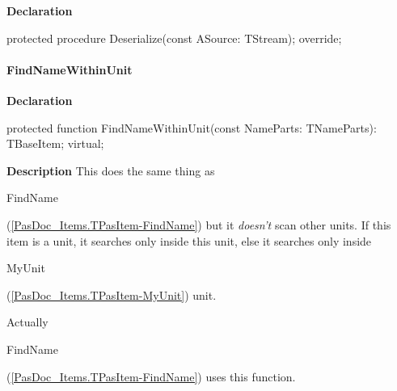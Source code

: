 \documentclass{report}
\newif\ifpdf
\begin{document}
\label{PasDoc_Items.TPasItem-Deserialize}
\begin{list}{}{
\setlength{\itemindent}{0cm}
\setlength{\listparindent}{0cm}
\setlength{\leftmargin}{\evensidemargin}
\addtolength{\leftmargin}{\tmplength}
\settowidth{\labelsep}{X}
\addtolength{\leftmargin}{\labelsep}
\setlength{\labelwidth}{\tmplength}
}
\item[\textbf{Declaration}\hfill]
\ifpdf
\begin{flushleft}
\fi
\begin{ttfamily}
protected procedure Deserialize(const ASource: TStream); override;\end{ttfamily}

\ifpdf
\end{flushleft}
\fi

\end{list}
\paragraph*{FindNameWithinUnit}\hspace*{\fill}

\label{PasDoc_Items.TPasItem-FindNameWithinUnit}
\begin{list}{}{
\setlength{\itemindent}{0cm}
\setlength{\listparindent}{0cm}
\setlength{\leftmargin}{\evensidemargin}
\addtolength{\leftmargin}{\tmplength}
\settowidth{\labelsep}{X}
\addtolength{\leftmargin}{\labelsep}
\setlength{\labelwidth}{\tmplength}
}
\item[\textbf{Declaration}\hfill]
\ifpdf
\begin{flushleft}
\fi
\begin{ttfamily}
protected function FindNameWithinUnit(const NameParts: TNameParts): TBaseItem; virtual;\end{ttfamily}

\ifpdf
\end{flushleft}
\fi

\par
\item[\textbf{Description}]
This does the same thing as \begin{ttfamily}FindName\end{ttfamily}(\ref{PasDoc_Items.TPasItem-FindName}) but it \textit{doesn't} scan other units. If this item is a unit, it searches only inside this unit, else it searches only inside \begin{ttfamily}MyUnit\end{ttfamily}(\ref{PasDoc_Items.TPasItem-MyUnit}) unit.

Actually \begin{ttfamily}FindName\end{ttfamily}(\ref{PasDoc_Items.TPasItem-FindName}) uses this function.

\end{list}
\end{document}
